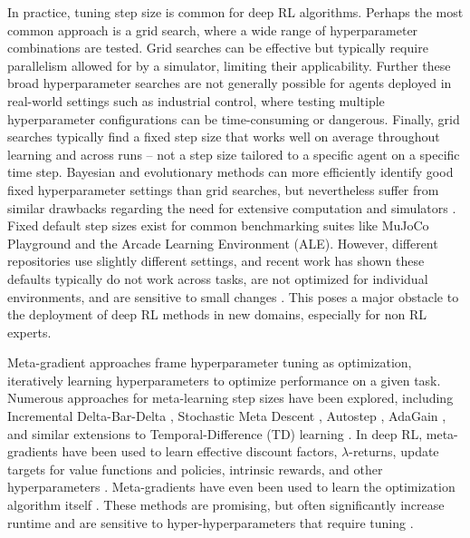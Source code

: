   In practice, tuning step size is common for deep RL algorithms. Perhaps the most common
  approach is a grid search, where a wide range of hyperparameter combinations are tested. Grid searches can be effective but typically require parallelism allowed for by a simulator, limiting their applicability. Further these broad hyperparameter searches are not generally possible for agents deployed in real-world settings such as industrial control\cite{luo2022controlling,janjua2024gvfs}, where testing multiple
  hyperparameter configurations can be time-consuming or dangerous. Finally, grid searches typically find a fixed step size that works well on average throughout learning and across runs -- not a step size tailored to a specific agent on a specific time step.
  Bayesian and evolutionary methods can more efficiently identify good fixed hyperparameter settings than grid searches, but nevertheless suffer from similar drawbacks regarding the need for extensive computation and simulators \cite{parker2022automated}. Fixed default step sizes exist for common benchmarking suites like MuJoCo Playground and the Arcade Learning Environment (ALE). 
  However, different repositories use slightly different settings, and recent work has shown these
  defaults typically do not work across tasks, are not optimized for individual environments, and are sensitive to
  small changes \cite{patterson2024chtb,adkins2024method,eimer2023hyperparameters}.
  This poses a major obstacle to the deployment of deep RL methods in new domains, especially for non RL experts.
  
  Meta-gradient approaches frame
  hyperparameter tuning as optimization, iteratively learning hyperparameters to optimize performance on a given task. Numerous approaches for meta-learning step sizes have been explored, including Incremental Delta-Bar-Delta \cite{sutton1992adapting}, Stochastic Meta Descent \cite{schraudolph1999local}, Autostep \cite{mahmood2012tuning}, AdaGain \cite{jacobsen2019metadescent}, and similar extensions to Temporal-Difference
  (TD) learning \cite{kearney2018tidbd,young2019metatrace,thill2015temporal}.
  In deep RL, meta-gradients have been used to learn effective discount factors, $\lambda$-returns, update targets for value
  functions and policies, intrinsic rewards, and other hyperparameters
  \cite{xu2018meta,xu2020meta,oh2020discovering,kirsch2020improving,wang2020metasac,zheng2020what,bonnet2022debiasing,zahavy2020self,zheng2018learning}.
  Meta-gradients have even been used to learn the optimization algorithm itself
  \cite{andrychowicz2016learning,lan2024learning}.
  These methods are promising, but often significantly increase runtime and are sensitive to hyper-hyperparameters that require tuning . 
  
